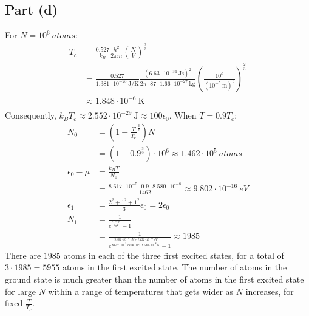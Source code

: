 \documentclass{article}
\begin{document}
\subsection*{Part (d)}
For $N = 10^6~\unit{atoms}$:
\begin{equation}
    \begin{split}
        T_c & = \frac{0.527}{k_B}\frac{h^2}{2\pi m}{\left(\frac{N}{V}\right)}^{\frac{2}{3}} \\
        & = \frac{0.527}{1.381 \cdot 10^{-23}~\unit{\joule\per\kelvin}}\frac{{\left(6.63 \cdot 10^{-34}~\unit{\joule\second}\right)}^2}{2\pi \cdot 87 \cdot 1.66 \cdot 10^{-27}~\unit{\kilo\gram}}{\left(\frac{10^6}{{\left(10^{-5}~\unit{\meter}\right)}^3}\right)}^{\frac{2}{3}} \\
        & \approx 1.848 \cdot 10^{-6}~\unit{\kelvin} \\
    \end{split}
\end{equation}
Consequently, $k_BT_c \approx 2.552 \cdot 10^{-29}~\unit{\joule} \approx 100\epsilon_0$. When $T = 0.9T_c$:
\begin{equation}
    \begin{split}
        N_0 & = \left(1 - \frac{T}{T_c}^{\frac{3}{2}}\right)N \\
        & = \left(1 - 0.9^{\frac{3}{2}}\right) \cdot 10^6 \approx 1.462 \cdot 10^5~\unit{atoms} \\
        \epsilon_0 - \mu & = \frac{k_BT}{N_0} \\
        & = \frac{8.617 \cdot 10^{-5} \cdot 0.9 \cdot 8.580 \cdot 10^{-8}}{1462} \approx 9.802 \cdot 10^{-16}~\unit{eV} \\
        \epsilon_1 & = \frac{2^2 + 1^2 + 1^2}{3}\epsilon_0 = 2\epsilon_0 \\
        N_1 & = \frac{1}{e^{\frac{\epsilon_1 - \mu}{k_BT}} - 1} \\
        & = \frac{1}{e^{\frac{9.802 \cdot 10^{-16}~\unit{eV} + 7.122 \cdot 10^{-14}~\unit{eV}}{8.617 \cdot 10^{-5}~\unit{eV\per\kelvin} \cdot 0.9 \cdot 8.580 \cdot 10^{-8}~\unit{\kelvin} }} - 1} \approx 1985
    \end{split}
\end{equation}
There are $1985$ atoms in each of the three first excited states, for a total of $3 \cdot 1985 = 5955$ atoms in the first excited state. The number of atoms in the ground state is much greater than the number of atoms in the first excited state for large $N$ within a range of temperatures that gets wider as $N$ increases, for fixed $\frac{T}{T_c}$.
\end{document}
